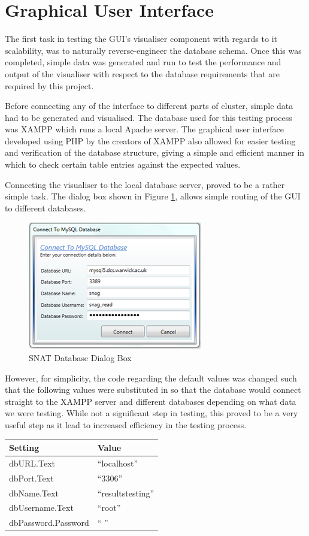 \section{Graphical User Interface}
The first task in testing the GUI's visualiser component with regards to it scalability, was to naturally reverse-engineer the database schema. Once this was completed, simple data was generated and run to test the performance and output of the visualiser with respect to the database requirements that are required by this project. 

Before connecting any of the interface to different parts of cluster, simple data had to be generated and visualised. The database used for this testing process was XAMPP which runs a local Apache server. The graphical user interface developed using PHP by the creators of XAMPP also allowed for easier testing and verification of the database structure, giving a simple and efficient manner in which to check certain table entries against the expected values.

Connecting the visualiser to the local database server, proved to be a rather simple task. The dialog box shown in Figure \ref{fig:mysql}, allows simple routing of the GUI to different databases. 

\begin{figure}[htbp]%
\centering
\includegraphics[width=0.5\columnwidth]{./img/mysql}%
\caption{SNAT Database Dialog Box}%
\label{fig:mysql}%
\end{figure}

However, for simplicity, the code regarding the default values was changed such that the following values were substituted in so that the database would connect straight to the XAMPP server and different databases depending on what data we were testing. While not a significant step in testing, this proved to be a very useful step as it lead to increased efficiency in the testing process.

\begin{table}[htbp]%
\centering
\begin{tabular}{l|l}
Setting & Value \\
\hline
dbURL.Text & ``localhost'' \\
dbPort.Text & ``3306'' \\
dbName.Text & ``resultstesting'' \\
dbUsername.Text & ``root'' \\
dbPassword.Password & `` '' \\
\end{tabular}
\end{table}

